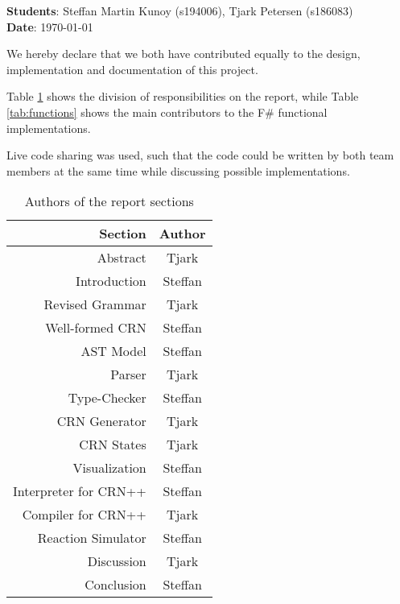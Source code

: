 \documentclass[12pt,a4paper]{report}
\begin{document}
\textbf{Students}: Steffan Martin Kunoy (s194006), Tjark Petersen (s186083)\\
\textbf{Date}: \today

\bigskip

We hereby declare that we both have contributed equally to the design, implementation and documentation of this project.

Table \ref{tab:report} shows the division of responsibilities on the report, while Table \ref{tab:functions} shows the main contributors to the F\# functional implementations.

Live code sharing was used, such that the code could be written by both team members at the same time while discussing possible implementations.

\begin{table}[h]
    \centering
    \begin{tabular}{r|c}
        \textbf{Section} & \textbf{Author}  \\\hline
        Abstract & Tjark \\
        Introduction & Steffan\\
        Revised Grammar & Tjark\\
        Well-formed CRN & Steffan \\
        AST Model & Steffan \\
        Parser & Tjark \\
        Type-Checker & Steffan \\
        CRN Generator & Tjark \\
        CRN States & Tjark \\
        Visualization & Steffan \\
        Interpreter for CRN++ & Steffan \\
        Compiler for CRN++ & Tjark \\
        Reaction Simulator & Steffan \\
        Discussion & Tjark \\
        Conclusion & Steffan \\
    \end{tabular}
    \caption{Authors of the report sections}
    \label{tab:report}
\end{table}
\end{document}
